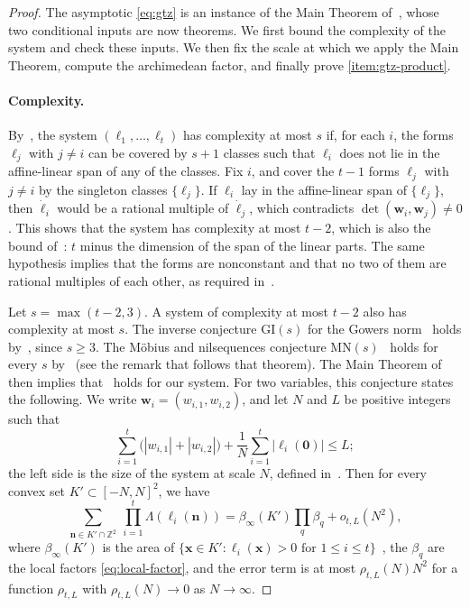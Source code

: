 \documentclass[12pt,oneside,openany]{book}
\theoremstyle{definition}
\theoremstyle{plain}
\numberwithin{equation}{chapter}
\theoremstyle{plain}
\theoremstyle{definition}
\theoremstyle{remark}
\newcommand{\Z}{\mathbb Z}
\begin{document}
\begin{proof}
The asymptotic \eqref{eq:gtz} is an instance of the Main Theorem of~\cite{GT2010}, whose two conditional inputs are now theorems. We first bound the complexity of the system and check these inputs. We then fix the scale at which we apply the Main Theorem, compute the archimedean factor, and finally prove \ref{item:gtz-product}.

\paragraph{Complexity.} By~\cite[Definition~1.5]{GT2010}, the system $(\ell_1,\dots,\ell_t)$ has complexity at most $s$ if, for each $i$, the forms $\ell_j$ with $j\ne i$ can be covered by $s+1$ classes such that $\ell_i$ does not lie in the affine-linear span of any of the classes. Fix $i$, and cover the $t-1$ forms $\ell_j$ with $j\ne i$ by the singleton classes $\{\ell_j\}$. If $\ell_i$ lay in the affine-linear span of $\{\ell_j\}$, then $\dot\ell_i$ would be a rational multiple of $\dot\ell_j$, which contradicts $\det(\mathbf w_i,\mathbf w_j)\ne0$. This shows that the system has complexity at most $t-2$, which is also the bound of~\cite[Lemma~1.6]{GT2010}: $t$ minus the dimension of the span of the linear parts. The same hypothesis implies that the forms are nonconstant and that no two of them are rational multiples of each other, as required in~\cite[Definition~1.1]{GT2010}.

Let $s=\max(t-2,3)$. A system of complexity at most $t-2$ also has complexity at most $s$. The inverse conjecture $\mathrm{GI}(s)$ for the Gowers norm~\cite[Conjecture~8.3]{GT2010} holds by~\cite[Theorem~1.3]{GTZ2012}, since $s\ge3$. The M\"obius and nilsequences conjecture $\mathrm{MN}(s)$~\cite[Conjecture~8.5]{GT2010} holds for every $s$ by~\cite[Theorem~1.1]{GT2012} (see the remark that follows that theorem). The Main Theorem of~\cite{GT2010} then implies that~\cite[Conjecture~1.2]{GT2010} holds for our system. For two variables, this conjecture states the following. We write $\mathbf w_i=(w_{i,1},w_{i,2})$, and let $N$ and $L$ be positive integers such that
\begin{equation}\label{eq:gt-size}
\sum_{i=1}^t\big(|w_{i,1}|+|w_{i,2}|\big)+\frac1N\sum_{i=1}^t|\ell_i(\mathbf 0)|\le L;
\end{equation}
the left side is the size of the system at scale $N$, defined in~\cite[(1.1)]{GT2010}. Then for every convex set $K'\subset[-N,N]^2$, we have
\begin{equation}\label{eq:gt-conjecture}
\sum_{\mathbf n\in K'\cap\Z^2}\ \prod_{i=1}^t\Lambda(\ell_i(\mathbf n))=\beta_\infty(K')\prod_q\beta_q+o_{t,L}(N^2),
\end{equation}
where $\beta_\infty(K')$ is the area of $\{\mathbf x\in K':\ell_i(\mathbf x)>0\text{ for }1\le i\le t\}$~\cite[(1.4)]{GT2010}, the $\beta_q$ are the local factors \eqref{eq:local-factor}, and the error term is at most $\rho_{t,L}(N)N^2$ for a function $\rho_{t,L}$ with $\rho_{t,L}(N)\to0$ as $N\to\infty$.


\end{proof}
\end{document}
